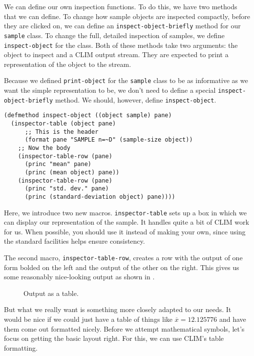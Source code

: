 We can define our own inspection functions. To do this, we have two
methods that we can define. To change how sample objects are inspected
compactly, before they are clicked on, we can define an
\texttt{inspect-object-briefly} method for our \texttt{sample} class. To
change the full, detailed inspection of samples, we define
\texttt{inspect-object} for the class. Both of these methods take two
arguments: the object to inspect and a CLIM output stream. They are
expected to print a representation of the object to the stream.

Because we defined \texttt{print-object} for the \texttt{sample} class to
be as informative as we want the simple representation to be, we don't
need to define a special \texttt{inspect-object-briefly} method. We
should, however, define \texttt{inspect-object}.

\begin{verbatim}
(defmethod inspect-object ((object sample) pane)
  (inspector-table (object pane)
      ;; This is the header
      (format pane "SAMPLE n=~D" (sample-size object))
    ;; Now the body
    (inspector-table-row (pane)
      (princ "mean" pane)
      (princ (mean object) pane))
    (inspector-table-row (pane)
      (princ "std. dev." pane)
      (princ (standard-deviation object) pane))))
\end{verbatim}

Here, we introduce two new macros. \texttt{inspector-table} sets up a box
in which we can display our representation of the sample. It handles
quite a bit of CLIM work for us. When possible, you should use it
instead of making your own, since using the standard facilities helps
ensure consistency.

The second macro, \texttt{inspector-table-row}, creates a row with the
output of one form bolded on the left and the output of the other on
the right. This gives us some reasonably nice-looking output as shown
in .

\begin{figure}
\begin{center}
\end{center}
\caption{\label{fig-inspect-object-1}
Output as a table.}
\end{figure}

But what we really want is something more closely adapted to our
needs. It would be nice if we could just have a table of things like
$ \overline {x} = 12.125776 $ and have them come out formatted
nicely. Before we attempt mathematical symbols, let's focus on getting
the basic layout right. For this, we can use CLIM's table formatting.

